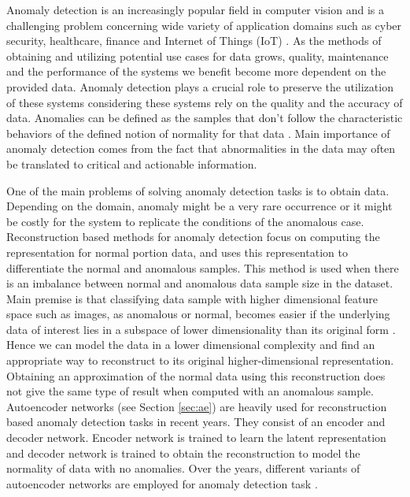 
\begingroup

Anomaly detection is an increasingly popular field in computer vision and is a challenging 
problem concerning wide variety of application domains such as cyber security, healthcare, 
finance and Internet of Things (IoT) \cite{Chandola:2009:ADS:1541880.1541882}. As the methods 
of obtaining and utilizing potential use cases for data grows, quality, maintenance and 
the performance of the systems we benefit become more dependent on the provided data. 
Anomaly detection plays a crucial role to preserve the utilization of these systems considering 
these systems rely on the quality and the accuracy of data. Anomalies can be defined as the 
samples that don't follow the characteristic behaviors of the defined notion of normality 
for that data \cite{Chandola07anomalydetection:}. Main importance of anomaly detection comes 
from the fact that abnormalities in the data may often be translated to critical and 
actionable information. 

One of the main problems of solving anomaly detection tasks is to obtain data. 
Depending on the domain, anomaly might be a very rare occurrence or it might be costly for the 
system to replicate the conditions of the anomalous case. Reconstruction based methods for anomaly 
detection focus on computing the representation for normal portion data, and uses this representation 
to differentiate the normal and anomalous samples. This method is used when there is an imbalance 
between normal and anomalous data sample size in the dataset. Main premise is that classifying 
data sample with higher dimensional feature space such as images, as anomalous or normal, 
becomes easier if the underlying data of interest lies in a subspace of lower dimensionality 
than its original form \cite{Beyer:1999:NNM:645503.656271}. 
Hence we can model the data in a lower dimensional complexity and find an appropriate way to reconstruct 
to its original higher-dimensional representation. Obtaining an approximation of the normal data using 
this reconstruction does not give the same type of result when computed with an anomalous sample. 
Autoencoder networks (see Section \ref{sec:ae}) are heavily used for reconstruction based anomaly 
detection tasks in recent years. They consist of an encoder and decoder network. Encoder 
network is trained to learn the latent representation and decoder network is trained to obtain 
the reconstruction to model the normality of data with no anomalies. Over the years, different 
variants of autoencoder networks are employed for anomaly detection task
\cite{kingma2013autoencoding, Masci2011StackedCA, an2015variational, leveau2017adversarial, Pidhorskyi:2018:GPN:3327757.3327787}.

